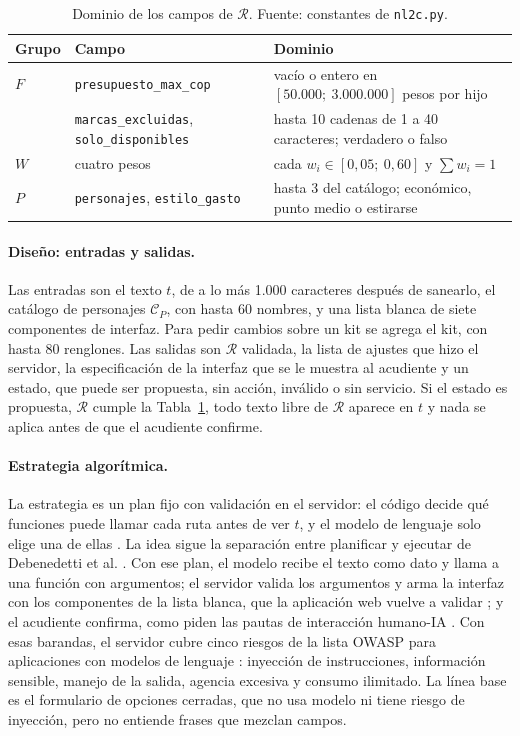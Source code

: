 \begin{table}[H]
\centering\footnotesize
\caption{Dominio de los campos de $\mathcal{R}$. Fuente: constantes de \texttt{nl2c.py}.}
\label{tab:nl2c-dominios}
\begin{tabularx}{\textwidth}{@{}p{1.2cm}p{4.2cm}X@{}}
\toprule
Grupo & Campo & Dominio \\
\midrule
$F$ & \texttt{presupuesto\_max\_cop} & vacío o entero en $[50.000;\ 3.000.000]$ pesos por hijo \\
 & \texttt{marcas\_excluidas}, \texttt{solo\_disponibles} & hasta 10 cadenas de 1 a 40 caracteres; verdadero o falso \\
$W$ & cuatro pesos & cada $w_i\in[0{,}05;\ 0{,}60]$ y $\sum w_i=1$ \\
$P$ & \texttt{personajes}, \texttt{estilo\_gasto} & hasta 3 del catálogo; económico, punto medio o estirarse \\
\bottomrule
\end{tabularx}
\end{table}

\paragraph{Diseño: entradas y salidas.} Las entradas son el texto $t$, de a lo más 1.000 caracteres
después de sanearlo, el catálogo de personajes $\mathcal{C}_P$, con hasta 60 nombres, y una lista
blanca de siete componentes de interfaz. Para pedir cambios sobre un kit se agrega el kit, con hasta
80 renglones. Las salidas son $\mathcal{R}$ validada, la lista de ajustes que hizo el servidor, la
especificación de la interfaz que se le muestra al acudiente y un estado, que puede ser propuesta,
sin acción, inválido o sin servicio. Si el estado es propuesta, $\mathcal{R}$ cumple la
Tabla~\ref{tab:nl2c-dominios}, todo texto libre de $\mathcal{R}$ aparece en $t$ y nada se aplica
antes de que el acudiente confirme.

\paragraph{Estrategia algorítmica.} La estrategia es un plan fijo con validación en el servidor: el
código decide qué funciones puede llamar cada ruta antes de ver $t$, y el modelo de lenguaje solo
elige una de ellas \citep{beurerkellner2025patterns}. La idea sigue la separación entre planificar y
ejecutar de Debenedetti et al. \citep{debenedetti2025camel}. Con ese plan, el modelo recibe el texto como dato y llama a
una función con argumentos; el servidor valida los argumentos y arma la interfaz con los componentes
de la lista blanca, que la aplicación web vuelve a validar \citep{chen2025genui}; y el acudiente
confirma, como piden las pautas de interacción humano-IA \citep{amershi_guidelines_2019}. Con esas
barandas, el servidor cubre cinco riesgos de la lista OWASP para aplicaciones con modelos de
lenguaje \citep{owasp2025llm}: inyección de instrucciones, información sensible, manejo de la
salida, agencia excesiva y consumo ilimitado. La línea base es el formulario de opciones cerradas,
que no usa modelo ni tiene riesgo de inyección, pero no entiende frases que mezclan campos.

